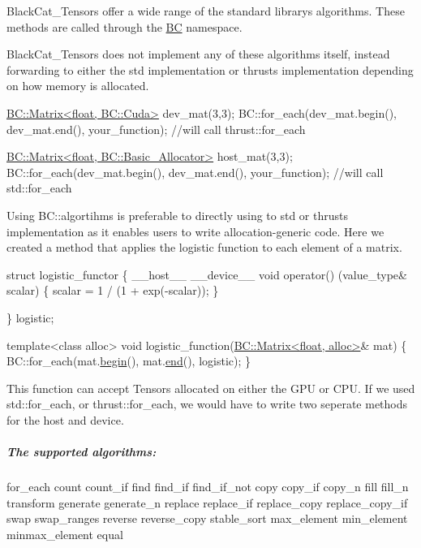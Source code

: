 Black\+Cat\+\_\+\+Tensor\textquotesingle{}s offer a wide range of the standard library\textquotesingle{}s algorithms. These methods are called through the {\ttfamily \hyperlink{namespaceBC}{BC}} namespace.

Black\+Cat\+\_\+\+Tensor\textquotesingle{}s does not implement any of these algorithms itself, instead forwarding to either the std implementation or thrust\textquotesingle{}s implementation depending on how memory is allocated.


\begin{DoxyCode}
\hyperlink{classBC_1_1tensors_1_1Tensor__Base}{BC::Matrix<float, BC::Cuda>} dev\_mat(3,3);
BC::for\_each(dev\_mat.begin(), dev\_mat.end(), your\_function);  \textcolor{comment}{//will call thrust::for\_each}

\hyperlink{classBC_1_1tensors_1_1Tensor__Base}{BC::Matrix<float, BC::Basic\_Allocator>} host\_mat(3,3);
BC::for\_each(dev\_mat.begin(), dev\_mat.end(), your\_function); \textcolor{comment}{//will call std::for\_each}
\end{DoxyCode}


Using B\+C\+::algortihms is preferable to directly using to std or thrust\textquotesingle{}s implementation as it enables user\textquotesingle{}s to write allocation-\/generic code. Here we created a method that applies the logistic function to each element of a matrix.


\begin{DoxyCode}
\textcolor{keyword}{struct }logistic\_functor \{
    \_\_host\_\_ \_\_device\_\_
    \textcolor{keywordtype}{void} operator() (value\_type& scalar) \{
        scalar =  1 / (1 + exp(-scalar));
    \}       

\} logistic; 

\textcolor{keyword}{template}<\textcolor{keyword}{class} alloc>
\textcolor{keywordtype}{void} logistic\_function(\hyperlink{classBC_1_1tensors_1_1Tensor__Base}{BC::Matrix<float, alloc>}& mat) \{
    BC::for\_each(mat.\hyperlink{classBC_1_1tensors_1_1Tensor__IterAlgos_a73b44ff31a6c22a172e03f31af4e4d64}{begin}(), mat.\hyperlink{classBC_1_1tensors_1_1Tensor__IterAlgos_a5bb5cbc94944c7225db9fd594656f011}{end}(), logistic); 
\}
\end{DoxyCode}


This function can accept Tensors allocated on either the G\+PU or C\+PU. If we used std\+::for\+\_\+each, or thrust\+::for\+\_\+each, we would have to write two seperate methods for the host and device.

\subparagraph*{The supported algorithms\+:}

\begin{DoxyVerb}for_each
count
count_if
find
find_if
find_if_not
copy
copy_if
copy_n
fill
fill_n
transform
generate
generate_n
replace
replace_if
replace_copy
replace_copy_if
swap
swap_ranges
reverse
reverse_copy
stable_sort
max_element
min_element
minmax_element
equal\end{DoxyVerb}
 